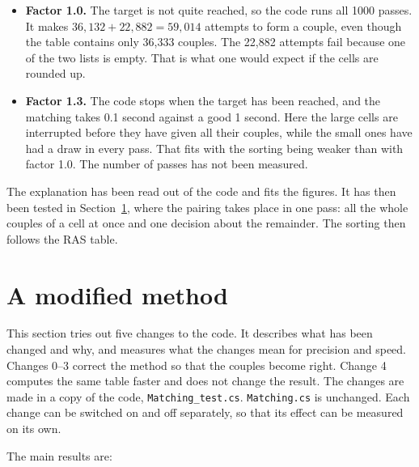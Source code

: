 \documentclass[12pt,a4paper]{article}
\newcommand{\kode}[1]{\texttt{#1}}
\begin{document}
\begin{itemize}
\item \textbf{Factor 1.0.} The target is not quite reached, so the code runs all 1000 passes. It
makes $36{,}132+22{,}882=59{,}014$ attempts to form a couple, even though the table contains only
36,333 couples. The 22,882 attempts fail because one of the two lists is empty. That is what one
would expect if the cells are rounded up.
\item \textbf{Factor 1.3.} The code stops when the target has been reached, and the matching takes
0.1 second against a good 1 second. Here the large cells are interrupted before they have given all
their couples, while the small ones have had a draw in every pass. That fits with the sorting being
weaker than with factor 1.0. The number of passes has not been measured.
\end{itemize}

The explanation has been read out of the code and fits the figures. It has then been tested in
Section~\ref{sec:nymetode}, where the pairing takes place in one pass: all the whole couples of a
cell at once and one decision about the remainder. The sorting then follows the RAS table.


\section{A modified method}\label{sec:nymetode}

This section tries out five changes to the code. It describes what has been changed and why, and
measures what the changes mean for precision and speed. Changes 0--3 correct the method so that the
couples become right. Change 4 computes the same table faster and does not change the result. The
changes are made in a copy of the code, \kode{Matching\_test.cs}. \kode{Matching.cs} is unchanged.
Each change can be switched on and off separately, so that its effect can be measured on its own.

The main results are:
\end{document}
